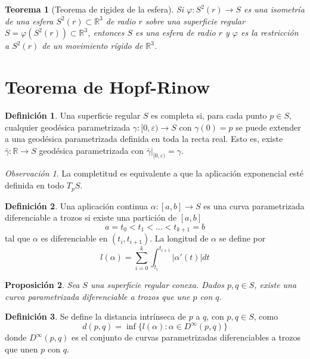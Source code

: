 \documentclass{report}
\newtheorem{theorem}{Teorema}[chapter]
\newtheorem{proposition}[theorem]{Proposición}
\theoremstyle{remark}
\newtheorem*{remark}{Observación}
\theoremstyle{remark}
\theoremstyle{definition}
\newtheorem{definition}{Definición}[chapter]
\theoremstyle{definition}
\theoremstyle{definition}
\begin{document}
\begin{theorem}[Teorema de rigidez de la esfera]
    Si $\varphi : S^2(r) \to S$ es una isometría de una esfera $S^2(r) \subset \mathbb{R}^3$ de radio $r$ sobre una superficie regular $S = \varphi(S^2(r)) \subset \mathbb{R}^3$, entonces $S$ es una esfera de radio $r$ y $\varphi$ es la restricción a $S^2(r)$ de un movimiento rígido de $\mathbb{R}^3$.
\end{theorem}

\section{Teorema de Hopf-Rinow}

\begin{definition}
    Una superficie regular $S$ es completa si, para cada punto $p \in S$, cualquier geodésica parametrizada $\gamma : [0, \varepsilon) \to S$ con $\gamma(0) = p$ se puede extender a una geodésica parametrizada definida en toda la recta real.
    Esto es, existe $\bar{\gamma} : \mathbb{R} \to S$ geodésica parametrizada con $\bar{\gamma}|_{[0, \varepsilon)} = \gamma$.
\end{definition}

\begin{remark}
    La completitud es equivalente a que la aplicación exponencial esté definida en todo $T_pS$.
\end{remark}

\begin{definition}
    Una aplicación continua $\alpha : [a, b] \to S$ es una curva parametrizada diferenciable a trozos si existe una partición de $[a, b]$
    $$a = t_0 < t_1 < \dots < t_{k+1} = b$$
    tal que $\alpha$ es diferenciable en $(t_i, t_{i+1})$.
    La longitud de $\alpha$ se define por $$l(\alpha) = \sum^k_{i=0} \int^{t_{i+1}}_{t_i} |\alpha'(t)|dt$$
\end{definition}

\begin{proposition}
    Sea $S$ una superficie regular conexa.
    Dados $p, q \in S$, existe una curva parametrizada diferenciable a trozos que une $p$ con $q$.
\end{proposition}

\begin{definition}
    Se define la distancia intrínseca de $p$ a $q$, con $p, q \in S$, como $$d(p, q) = \inf \{ l(\alpha) : \alpha \in D^\infty(p,q) \}$$ donde $D^\infty(p, q)$ es el conjunto de curvas parametrizadas diferenciables a trozos que unen $p$ con $q$.
\end{definition}
\end{document}
